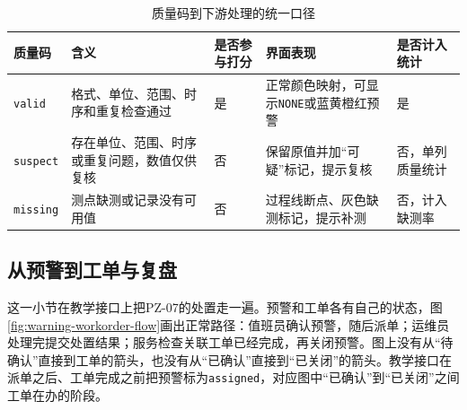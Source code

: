 \begin{table}[htbp]
\centering
\caption{质量码到下游处理的统一口径}
\label{tab:quality-code-downstream}
\begin{tabular}{p{1.7cm}p{3.3cm}p{2.2cm}p{4.0cm}p{2.1cm}}
\toprule
质量码 & 含义 & 是否参与打分 & 界面表现 & 是否计入统计 \\
\midrule
\texttt{valid} & 格式、单位、范围、时序和重复检查通过 & 是 & 正常颜色映射，可显示\texttt{NONE}或蓝黄橙红预警 & 是 \\
\texttt{suspect} & 存在单位、范围、时序或重复问题，数值仅供复核 & 否 & 保留原值并加“可疑”标记，提示复核 & 否，单列质量统计 \\
\texttt{missing} & 测点缺测或记录没有可用值 & 否 & 过程线断点、灰色缺测标记，提示补测 & 否，计入缺测率 \\
\bottomrule
\end{tabular}
\end{table}

\subsection{从预警到工单与复盘}

这一小节在教学接口上把PZ-07的处置走一遍。预警和工单各有自己的状态，图\ref{fig:warning-workorder-flow}画出正常路径：值班员确认预警，随后派单；运维员处理完提交处置结果；服务检查关联工单已经完成，再关闭预警。图上没有从“待确认”直接到工单的箭头，也没有从“已确认”直接到“已关闭”的箭头。教学接口在派单之后、工单完成之前把预警标为\texttt{assigned}，对应图中“已确认”到“已关闭”之间工单在办的阶段。

